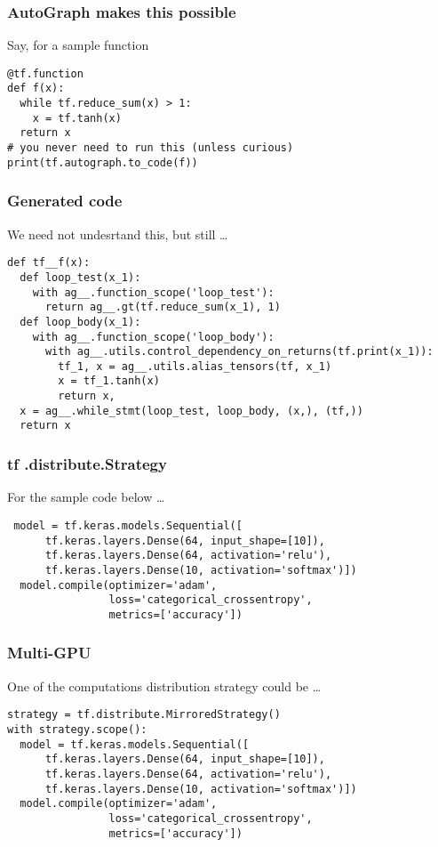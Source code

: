 \begin{frame}[fragile] \frametitle{AutoGraph makes this possible}

Say, for a sample function
\begin{lstlisting}
@tf.function
def f(x):
  while tf.reduce_sum(x) > 1:
    x = tf.tanh(x)
  return x
# you never need to run this (unless curious)
print(tf.autograph.to_code(f))
\end{lstlisting}
\end{frame}

\begin{frame}[fragile] \frametitle{Generated code}

We need not undesrtand this, but still \ldots
\begin{lstlisting}
def tf__f(x):
  def loop_test(x_1):
    with ag__.function_scope('loop_test'):
      return ag__.gt(tf.reduce_sum(x_1), 1)
  def loop_body(x_1):
    with ag__.function_scope('loop_body'):
      with ag__.utils.control_dependency_on_returns(tf.print(x_1)):
        tf_1, x = ag__.utils.alias_tensors(tf, x_1)
        x = tf_1.tanh(x)
        return x,
  x = ag__.while_stmt(loop_test, loop_body, (x,), (tf,))
  return x
\end{lstlisting}
\end{frame}

\begin{frame}[fragile] \frametitle{tf .distribute.Strategy}

For the sample code below \ldots
\begin{lstlisting}
 model = tf.keras.models.Sequential([
      tf.keras.layers.Dense(64, input_shape=[10]),
      tf.keras.layers.Dense(64, activation='relu'),
      tf.keras.layers.Dense(10, activation='softmax')])
  model.compile(optimizer='adam',
                loss='categorical_crossentropy',
                metrics=['accuracy'])
\end{lstlisting}
\end{frame}

\begin{frame}[fragile] \frametitle{ Multi-GPU}

One of the computations distribution strategy could be \ldots
\begin{lstlisting}
strategy = tf.distribute.MirroredStrategy()
with strategy.scope():
  model = tf.keras.models.Sequential([
      tf.keras.layers.Dense(64, input_shape=[10]),
      tf.keras.layers.Dense(64, activation='relu'),
      tf.keras.layers.Dense(10, activation='softmax')])
  model.compile(optimizer='adam',
                loss='categorical_crossentropy',
                metrics=['accuracy'])
\end{lstlisting}
\end{frame}


